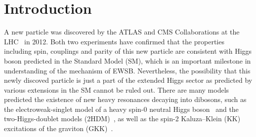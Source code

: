 \section{Introduction}

A new particle was discovered by the ATLAS and CMS Collaborations at the LHC~\cite{20121, 201230} in 2012.
Both two experiments have confirmed that the properties including spin, couplings and parity of this new particle are consistent with 
Higgs boson predicted in the Standard Model (SM), which is an important milestone in understanding of the mechanism of EWSB.
Nevertheless, the possibility that this newly discoved particle is just a part of the extended Higgs sector
as predicted by various extensions in the SM cannot be ruled out.
There are many models predicted the existence of new heavy resonances decaying into dibosons, 
such as the electroweak-singlet model of a heavy spin-0 neutral Higgs boson~\cite{PhysRevD.36.3463}
and the two-Higgs-doublet models (2HDM)~\cite{BRANCO20121}, 
as well as the spin-2 Kaluza–Klein (KK) excitations of the graviton (GKK)~\cite{DAVOUDIASL200043}.

